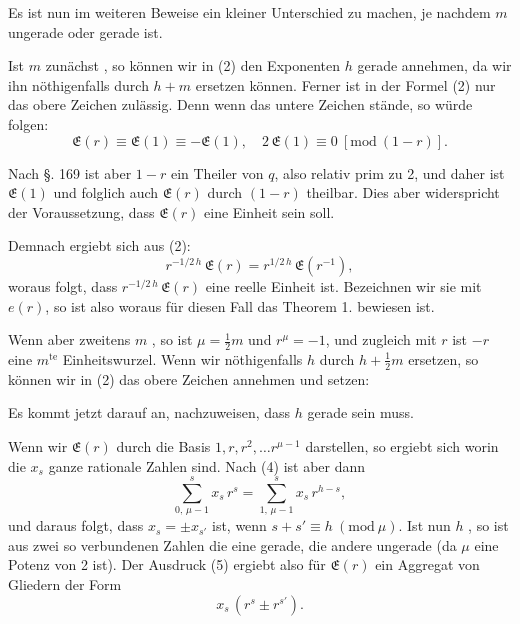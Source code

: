 
Es ist nun im weiteren Beweise ein kleiner Unterschied zu machen, je nachdem $m$ ungerade oder gerade ist.

Ist $m$ zunächst , so können wir in (2) den Exponenten $h$ gerade annehmen, da wir ihn nöthigenfalls durch $h + m$ ersetzen können. Ferner ist in der Formel (2) nur das obere Zeichen zulässig. Denn wenn das untere Zeichen stände, so würde folgen:
\[
\mathfrak{E}(r) \equiv \mathfrak{E}(1) \equiv -\mathfrak{E}(1), \quad 2\,\mathfrak{E}(1) \equiv 0\ [\mathrm{mod}\ (1 - r)].
\]

Nach §. 169 ist aber $1 - r$ ein Theiler von $q$, also relativ prim zu 2, und daher ist $\mathfrak{E}(1)$ und folglich auch $\mathfrak{E}(r)$ durch $(1 - r)$ theilbar. Dies aber widerspricht der Voraussetzung, dass $\mathfrak{E}(r)$ eine Einheit sein soll.

Demnach ergiebt sich aus (2):
\[
r^{-1/2\,h}\, \mathfrak{E}(r) = r^{1/2\,h}\, \mathfrak{E}(r^{-1}),
\]
woraus folgt, dass $r^{-1/2\,h}\, \mathfrak{E}(r)$ eine reelle Einheit ist. Bezeichnen wir sie mit $e(r)$, so ist also
woraus für diesen Fall das Theorem 1. bewiesen ist.

Wenn aber zweitens $m$ , so ist $\mu = \tfrac{1}{2} m$ und $r^\mu = -1$, und zugleich mit $r$ ist $-r$ eine $m^{\text{te}}$ Einheitswurzel. Wenn wir nöthigenfalls $h$ durch $h + \tfrac{1}{2} m$ ersetzen, so können wir in (2) das obere Zeichen annehmen und setzen:

Es kommt jetzt darauf an, nachzuweisen, dass $h$ gerade sein muss.

Wenn wir $\mathfrak{E}(r)$ durch die Basis $1, r, r^2, \ldots r^{\mu-1}$ darstellen, so ergiebt sich
worin die $x_s$ ganze rationale Zahlen sind. Nach (4) ist aber dann
\[
\sum_{0,\,\mu-1}^{s} x_s\, r^s = \sum_{1,\,\mu-1}^{s} x_s\, r^{h-s}, %
\]
und daraus folgt, dass $x_s = \pm x_{s'}$ ist, wenn $s + s' \equiv h\ (\mathrm{mod}\ \mu)$. Ist nun $h$ , so ist aus zwei so verbundenen Zahlen die eine gerade, die andere ungerade (da $\mu$ eine Potenz von 2 ist). Der Ausdruck (5) ergiebt also für $\mathfrak{E}(r)$ ein Aggregat von Gliedern der Form
\[
x_s\,(r^s \pm r^{s'}).
\]
